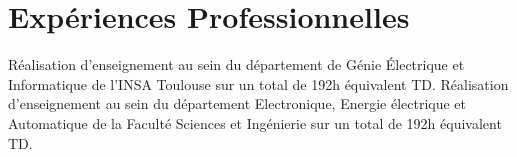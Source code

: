 \documentclass[11pt,a4paper,sans]{moderncv}         %
\begin{document}
\section{Exp\'eriences Professionnelles}
{
R\'ealisation d'enseignement au sein du d\'epartement de G\'enie \'Electrique et Informatique de l'INSA Toulouse sur un total de 192h \'equivalent TD.
}
{
R\'ealisation d'enseignement au sein du d\'epartement Electronique, Energie \'electrique et Automatique de la Facult\'e Sciences et Ing\'enierie sur un total de 192h \'equivalent TD.
}
\end{document}
